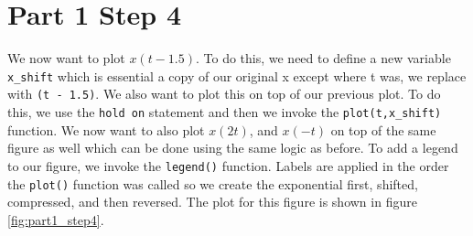 \documentclass[a4paper, 10pt]{article}
\begin{document}
\section*{Part 1 Step 4}
We now want to plot $x(t - 1.5)$. To do this, we need to define a new variable \texttt{x\_shift} which is essential a copy of our original x except where t was, we replace with \texttt{(t - 1.5)}. We also want to plot this on top of our previous plot. To do this, we use the \texttt{hold on} statement and then we invoke the \texttt{plot(t,x\_shift)} function. We now want to also plot $x(2t)$, and $x(-t)$ on top of the same figure as well which can be done using the same logic as before. To add a legend to our figure, we invoke the \texttt{legend()} function. Labels are applied in the order the \texttt{plot()} function was called so we create the exponential first, shifted, compressed, and then reversed. The plot for this figure is shown in figure \ref{fig:part1_step4}.
\end{document}
